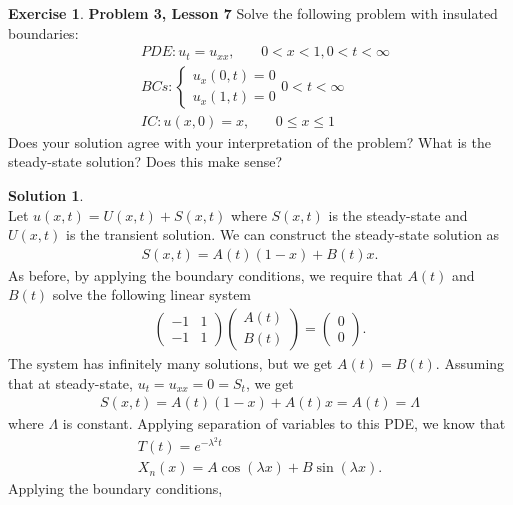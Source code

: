 \documentclass{article}
\theoremstyle{definition}
\newtheorem*{exer*}{Exercise}
\newtheorem*{sln*}{Solution}
\begin{document}
\begin{exer*}\textbf{Problem 3, Lesson 7}
	Solve the following problem with insulated boundaries:
	\begin{align*}
	&PDE: u_t = u_{xx},\,\,\,\,\,\,\,\,\,\,\, 0<x<1, 0<t<\infty\\
	&BCs:  
	\begin{cases}
	u_x(0,t) = 0\\
	u_x(1,t) = 0
	\end{cases} 0 < t < \infty\\
	&IC: u(x,0) = x,\,\,\,\,\,\,\,\,\,\,\, 0 \leq x\leq 1
	\end{align*}
	Does your solution agree with your interpretation of the problem? What is the steady-state solution? Does this make sense? 
	\begin{sln*}
		$\,$\\
		\noindent Let $u(x,t) = U(x,t) + S(x,t)$ where $S(x,t)$ is the steady-state and $U(x,t)$ is the transient solution. We can construct the steady-state solution as
		\begin{align*}
		S(x,t) = A(t)\left(1 -x \right) + B(t)x.
		\end{align*}
		As before, by applying the boundary conditions, we require that $A(t)$ and $B(t)$ solve the following linear system
		\begin{align*}
		\begin{pmatrix}
		-1 & 1\\
		-1 & 1
		\end{pmatrix}
		\begin{pmatrix}
		A(t) \\ B(t)
		\end{pmatrix}
		=
		\begin{pmatrix}
		0\\0
		\end{pmatrix}.
		\end{align*}
		The system has infinitely many solutions, but we get $A(t) = B(t)$. Assuming that at steady-state, $u_t = u_{xx} = 0 = S_t$, we get
		\begin{align*}
		S(x,t) = A(t)(1-x) + A(t)x = A(t) = \Lambda
		\end{align*}
		where $\Lambda$ is constant. Applying separation of variables to this PDE, we know that 
		\begin{align*}
		T(t) = e^{-\lambda^2 t}\\
		X_n(x) = A\cos(\lambda x)  + B\sin(\lambda x).
		\end{align*}
		Applying the boundary conditions, 
		\begin{align*}

\end{align*}
\end{sln*}
\end{exer*}
\end{document}
